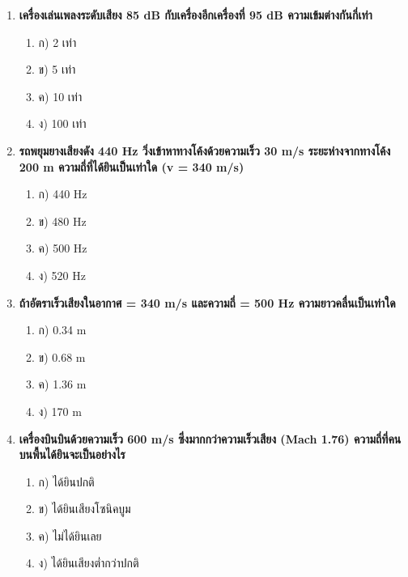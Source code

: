 \documentclass[12pt]{article}
\begin{document}
\begin{enumerate}
\item \textbf{เครื่องเล่นเพลงระดับเสียง 85 dB กับเครื่องอีกเครื่องที่ 95 dB ความเข้มต่างกันกี่เท่า}
\begin{enumerate}
\item ก) 2 เท่า
\item ข) 5 เท่า
\item ค) 10 เท่า
\item ง) 100 เท่า
\end{enumerate}
\item \textbf{รถพยุมยางเสียงดัง 440 Hz วิ่งเข้าหาทางโค้งด้วยความเร็ว 30 m/s ระยะห่างจากทางโค้ง 200 m ความถี่ที่ได้ยินเป็นเท่าใด (v = 340 m/s)}
\begin{enumerate}
\item ก) 440 Hz
\item ข) 480 Hz
\item ค) 500 Hz
\item ง) 520 Hz
\end{enumerate}
\item \textbf{ถ้าอัตราเร็วเสียงในอากาศ = 340 m/s และความถี่ = 500 Hz ความยาวคลื่นเป็นเท่าใด}
\begin{enumerate}
\item ก) 0.34 m
\item ข) 0.68 m
\item ค) 1.36 m
\item ง) 170 m
\end{enumerate}
\item \textbf{เครื่องบินบินด้วยความเร็ว 600 m/s ซึ่งมากกว่าความเร็วเสียง (Mach 1.76) ความถี่ที่คนบนพื้นได้ยินจะเป็นอย่างไร}
\begin{enumerate}
\item ก) ได้ยินปกติ
\item ข) ได้ยินเสียงโซนิคบูม
\item ค) ไม่ได้ยินเลย
\item ง) ได้ยินเสียงต่ำกว่าปกติ
\end{enumerate}
\end{enumerate}
\end{document}
